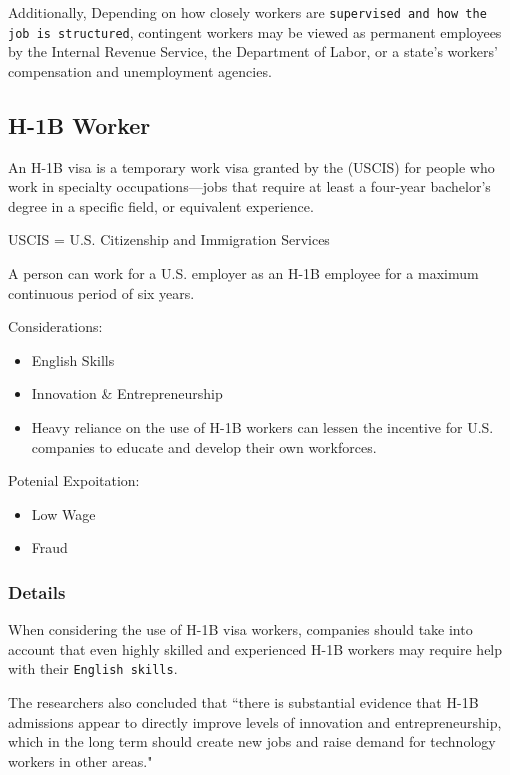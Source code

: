 \documentclass[11pt]{article}
\begin{document}
Additionally, Depending on how closely workers are \texttt{supervised and how the job is structured}, contingent workers may be viewed as permanent employees by the Internal Revenue Service, the Department of Labor, or a state’s workers’ compensation and unemployment agencies.

\subsection{H-1B Worker}
\label{sec:org78316b4}
An H-1B visa is a temporary work visa granted by the  (USCIS) for people who work in specialty occupations—jobs that require at least a four-year bachelor’s degree in a specific field, or equivalent experience.

USCIS = U.S. Citizenship and Immigration Services

A person can work for a U.S. employer as an H-1B employee for a maximum continuous period of six years.

Considerations:
\begin{itemize}
\item English Skills
\item Innovation \& Entrepreneurship
\item Heavy reliance on the use of H-1B workers can lessen the incentive for U.S. companies to educate and develop their own workforces.
\end{itemize}

Potenial Expoitation:
\begin{itemize}
\item Low Wage
\item Fraud
\end{itemize}

\subsubsection{Details}
\label{sec:org51a13a2}
When considering the use of H-1B visa workers, companies should take into account that even highly skilled and experienced H-1B workers may require help with their \texttt{English skills}.


The researchers also concluded that “there is substantial evidence that H-1B admissions appear to directly improve levels of innovation and entrepreneurship, which in the long term should create new jobs and raise demand for technology workers in other areas."
\end{document}

